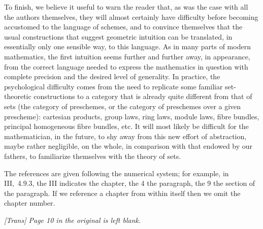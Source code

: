 \sectionbreak

To finish, we believe it useful to warn the reader that, as was the case with
all the authors themselves, they will almost certainly have difficulty before
becoming accustomed to the language of schemes, and to convince themselves that
the usual constructions that suggest geometric intuition can be translated, in
essentially only one sensible way, to this language. As in many parts of modern
mathematics, the first intuition seems further and further away, in appearance,
from the correct language needed to express the mathematics in question with
complete precision and the desired level of generality. In practice, the
psychological difficulty comes from the need to replicate some familiar
set-theoretic constructions to a category that is already quite different from
that of sets (the category of preschemes, or the category of preschemes over a
given prescheme): cartesian products, group laws, ring laws, module laws, fibre
bundles, principal homogeneous fibre bundles, etc. It will most likely
be difficult for the mathematician, in the future, to shy away from this new
effort of abstraction, maybe rather negligible, on the whole, in comparison with
that endowed by our fathers, to familiarize themselves with the theory of sets.

\sectionbreak

The references are given following the numerical system; for example, in
III,~4.9.3, the III indicates the chapter, the 4 the paragraph, the 9 the
section of the paragraph. If we reference a chapter from within itself then we
omit the chapter number.

\bigskip

{\it [Trans] Page 10 in the original is left blank.}






